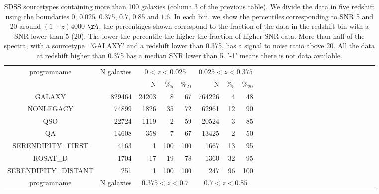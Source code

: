 \documentclass[onecolumn]{aa}
\begin{document}
\begin{table*}
\begin{center}
\caption{\label{ref:table:sdss:src:SNR}SDSS sourcetypes containing more than 100 galaxies (column 3 of the previous table). We divide the data in five redshift using the boundaries $0$, $0.025$, $0.375$, $0.7$, $0.85$ and $1.6$. In each bin, we show the percentiles corresponding to SNR 5 and 20 around $(1+z)4000$ $\AA$. 
the percentages shown correspond to the fraction of the data in the redshift bin with a SNR lower than 5 (20). 
The lower the percentile the higher the fraction of higher SNR data. 
More than half of the spectra, with a sourcetype='GALAXY' and a redshift lower than 0.375, has a signal to noise ratio above 20.
All the data at redshift higher than 0.375 has a median SNR lower than 5. 
'-1' means there is not data available. 
}
\begin{tabular}{c r rrrr rrrr rrrrr rrrrr rrrrr}
\hline \hline
programname & N galaxies &  \multicolumn{3}{c}{$0<z<0.025$} &  \multicolumn{3}{c}{$0.025<z<0.375$} \\
       		&   & N & \%$_{5}$ & \%$_{20}$ & N & \%$_{5}$ & \%$_{20}$ \\
\hline
GALAXY              & 829464 & 24203 & 8   & 67  & 764226 & 4  & 48  \\
NONLEGACY           & 74899  & 1826  & 35  & 72  & 62961  & 12 & 90  \\
QSO                 & 22724  & 1119  & 2   & 59  & 20524  & 3  & 85  \\
QA                  & 14608  & 358   & 7   & 67  & 13425  & 2  & 50  \\
SERENDIPITY\_FIRST   & 4163   & 1     & 100 & 100 & 1667   & 13 & 95  \\
ROSAT\_D             & 1704   & 17    & 19  & 78  & 1360   & 32 & 95  \\
SERENDIPITY\_DISTANT & 251    & 1     & 100 & 100 & 247    & 96 & 100 \\
\hline
programname & N galaxies &   \multicolumn{3}{c}{$0.375<z<0.7$} &  \multicolumn{3}{c}{$0.7<z<0.85$} \\

\end{tabular}
\end{center}
\end{table*}
\end{document}
